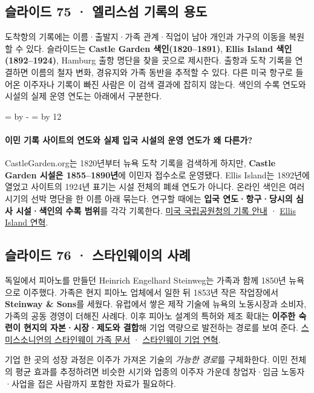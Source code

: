 \documentclass[10pt,a4paper]{article}
\newcommand{\ReserveQuestionSpace}{%
  \par\begingroup
  \dimen0=\pagegoal \advance\dimen0 by -\pagetotal
  \dimen2=\baselineskip \multiply\dimen2 by 12
  \ifdim\dimen0<\dimen2 \newpage\fi
  \endgroup}
\begin{document}
\subsection{슬라이드 75 · 엘리스섬 기록의 용도}
도착항의 기록에는 이름·출발지·가족 관계·직업이 남아 개인과 가구의 이동을 복원할 수 있다. 슬라이드는 \textbf{Castle Garden 색인(1820–1891)}, \textbf{Ellis Island 색인(1892–1924)}, Hamburg 출항 명단을 찾을 곳으로 제시한다. 출항과 도착 기록을 연결하면 이름의 철자 변화, 경유지와 가족 동반을 추적할 수 있다. 다른 미국 항구로 들어온 이주자나 기록이 빠진 사람은 이 검색 결과에 잡히지 않는다. 색인의 수록 연도와 시설의 실제 운영 연도는 아래에서 구분한다.\par

\ReserveQuestionSpace
\paragraph{이민 기록 사이트의 연도와 실제 입국 시설의 운영 연도가 왜 다른가?}

CastleGarden.org는 1820년부터 뉴욕 도착 기록을 검색하게 하지만, \textbf{Castle Garden 시설은 1855–1890년}에 이민자 접수소로 운영됐다. Ellis Island는 1892년에 열었고 사이트의 1924년 표기는 시설 전체의 폐쇄 연도가 아니다. 온라인 색인은 여러 시기의 선박 명단을 한 이름 아래 묶는다. 연구할 때에는 \textbf{입국 연도·항구·당시의 심사 시설·색인의 수록 범위}를 각각 기록한다. \href{https://www.nps.gov/elis/learn/historyculture/trace-ancestors-digging-deeper.htm}{미국 국립공원청의 기록 안내} · \href{https://www.nps.gov/elis/faqs.htm}{Ellis Island 연혁}.\par

\subsection{슬라이드 76 · 스타인웨이의 사례}
독일에서 피아노를 만들던 Heinrich Engelhard Steinweg는 가족과 함께 1850년 뉴욕으로 이주했다. 가족은 현지 피아노 업체에서 일한 뒤 1853년 작은 작업장에서 \textbf{Steinway \& Sons}를 세웠다. 유럽에서 쌓은 제작 기술에 뉴욕의 노동시장과 소비자, 가족의 공동 경영이 더해진 사례다. 이후 피아노 설계의 특허와 제조 확대는 \textbf{이주한 숙련이 현지의 자본·시장·제도와 결합}해 기업 역량으로 발전하는 경로를 보여 준다. \href{https://sirismm.si.edu/EADpdfs/NMAH.AC.0178.pdf}{스미스소니언의 스타인웨이 가족 문서} · \href{https://www.steinway.com/about/}{스타인웨이 기업 연혁}.\par

기업 한 곳의 성장 과정은 이주가 가져온 기술의 \emph{가능한 경로}를 구체화한다. 이민 전체의 평균 효과를 추정하려면 비슷한 시기와 업종의 이주자 가운데 창업자·임금 노동자·사업을 접은 사람까지 포함한 자료가 필요하다.\par
\end{document}
